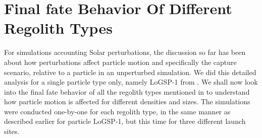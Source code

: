 \section{Final fate Behavior Of Different Regolith Types}
\label{sec:final_fate_general_all_launch_sites}
For simulations accounting Solar perturbations, the discussion so far has been about how perturbations affect particle motion and specifically the capture scenario, relative to a particle in an unperturbed simulation. We did this detailed analysis for a single particle type only, namely LoGSP-1 from . We shall now look into the final fate behavior of all the regolith types mentioned in  to understand how particle motion is affected for different densities and sizes. The simulations were conducted one-by-one for each regolith type, in the same manner as described earlier for particle LoGSP-1, but this time for three different launch sites.

